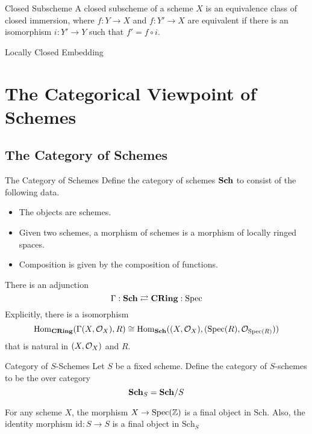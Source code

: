\documentclass[a4paper]{article}
\begin{document}
\begin{defn}{Closed Subscheme}{} A closed subscheme of a scheme $X$ is an equivalence class of closed immersion, where $f:Y\to X$ and $f:Y'\to X$ are equivalent if there is an isomorphism $i:Y'\to Y$ such that $f'=f\circ i$. 
\end{defn}

\begin{defn}{Locally Closed Embedding}{}
\end{defn}

\pagebreak
\section{The Categorical Viewpoint of Schemes}
\subsection{The Category of Schemes}
\begin{defn}{The Category of Schemes}{} Define the category of schemes $\bold{Sch}$ to consist of the following data. 
\begin{itemize}
\item The objects are schemes. 
\item Given two schemes, a morphism of schemes is a morphism of locally ringed spaces. 
\item Composition is given by the composition of functions. 
\end{itemize}
\end{defn}

\begin{prp}{}{} There is an adjunction $$\Gamma:\bold{Sch}\rightleftarrows\bold{CRing}:\text{Spec}$$ Explicitly, there is a isomorphism $$\operatorname{Hom}_\bold{CRing}(\Gamma(X,\mathcal{O}_X),R)\cong\operatorname{Hom}_\bold{Sch}((X,\mathcal{O}_X),(\text{Spec}(R),\mathcal{O}_{\text{Spec}(R)}))$$ that is natural in $(X,\mathcal{O}_X)$ and $R$. 
\end{prp}

\begin{defn}{Category of $S$-Schemes}{} Let $S$ be a fixed scheme. Define the category of $S$-schemes to be the over category $$\bold{Sch}_S=\bold{Sch}/S$$
\end{defn}

\begin{lmm}{}{} For any scheme $X$, the morphism $X\to\text{Spec}(\mathbb{Z})$ is a final object in $\text{Sch}$. Also, the identity morphism $\text{id}:S\to S$ is a final object in $\text{Sch}_S$
\end{lmm}
\end{document}

